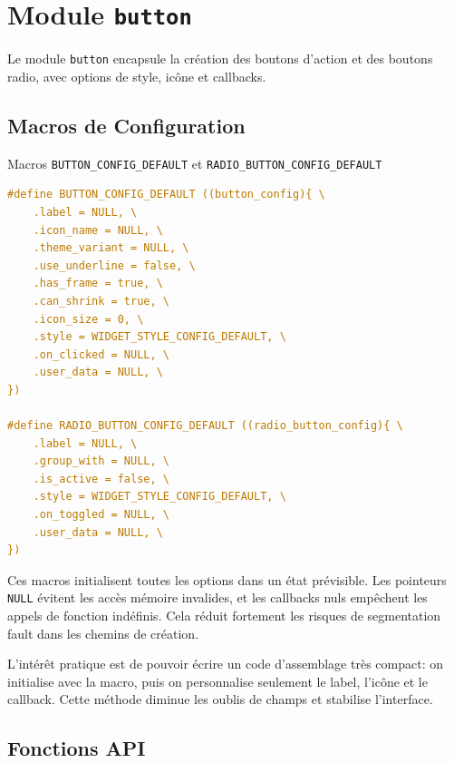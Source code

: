 \section{Module \texttt{button}}

Le module \texttt{button} encapsule la création des boutons d'action et des boutons radio, avec options de style, icône et callbacks.

\subsection{Macros de Configuration}

\begin{docbox}{Macros \texttt{BUTTON\_CONFIG\_DEFAULT} et \texttt{RADIO\_BUTTON\_CONFIG\_DEFAULT}}
\begin{lstlisting}[language=C]
#define BUTTON_CONFIG_DEFAULT ((button_config){ \
    .label = NULL, \
    .icon_name = NULL, \
    .theme_variant = NULL, \
    .use_underline = false, \
    .has_frame = true, \
    .can_shrink = true, \
    .icon_size = 0, \
    .style = WIDGET_STYLE_CONFIG_DEFAULT, \
    .on_clicked = NULL, \
    .user_data = NULL, \
})

#define RADIO_BUTTON_CONFIG_DEFAULT ((radio_button_config){ \
    .label = NULL, \
    .group_with = NULL, \
    .is_active = false, \
    .style = WIDGET_STYLE_CONFIG_DEFAULT, \
    .on_toggled = NULL, \
    .user_data = NULL, \
})
\end{lstlisting}
\end{docbox}

Ces macros initialisent toutes les options dans un état prévisible. Les pointeurs \texttt{NULL} évitent les accès mémoire invalides, et les callbacks nuls empêchent les appels de fonction indéfinis. Cela réduit fortement les risques de segmentation fault dans les chemins de création.

L'intérêt pratique est de pouvoir écrire un code d'assemblage très compact: on initialise avec la macro, puis on personnalise seulement le label, l'icône et le callback. Cette méthode diminue les oublis de champs et stabilise l'interface.

\subsection{Fonctions API}

